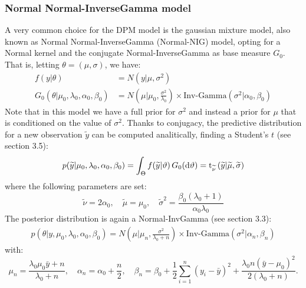 \subsubsection{Normal Normal-InverseGamma model} \label{nnig}
A very common choice for the DPM model is the gaussian mixture model, also known as Normal Normal-InverseGamma (Normal-NIG) model, opting for a Normal kernel and the conjugate Normal-InverseGamma as base measure $G_0$. That is, letting $\theta=(\mu,\sigma)$, we have:
\begin{equation}
	\begin{aligned}
		f(y|\theta)&=N(y| \mu ,\sigma^2)  \\
		G_0(\theta|\mu_0,\lambda_0, \alpha_0, 	\beta_0)
		&=N\left(\mu | \mu_0 ,\frac{\sigma^2} {\lambda_0}\right) \times \text{Inv-Gamma}(\sigma^2|\alpha_0, \beta_0 )
	\end{aligned}
\end{equation}
Note that in this model we have a full prior for $\sigma^2$ and instead a prior for $\mu$ that is conditioned on the value of $\sigma^2$.
Thanks to conjugacy, the predictive distribution for a new observation $\widetilde{y}$ can be computed analitically, finding a Student's $t$ (see \cite{integral} section 3.5):
\begin{align*}
	p(\widetilde{y}|\mu_0,\lambda_0, \alpha_0, \beta_0) =
	\int_\Theta f(\widetilde{y}|\vartheta) \, G_0(\mathrm d\vartheta) =
	\text{t}_{\widetilde \nu}\left(\widetilde{y}|\widetilde{\mu},\widetilde{\sigma}\right)
\end{align*}
where the following parameters are set:
$$
	\widetilde{\nu}=2 \alpha_0, \quad
	\widetilde{\mu}=\mu_0, \quad
	\widetilde{\sigma}^2= \frac{\beta_0(\lambda_0+1)}{\alpha_0 \lambda_0}
$$
The posterior distribution is again a Normal-InvGamma (see \cite{integral} section 3.3):
\begin{align*}
	p(\theta|y,\mu_0,\lambda_0, \alpha_0, \beta_0)=N\left(\mu | \mu_n ,\frac{\sigma^2} {\lambda_0 + n}\right) \times \text{Inv-Gamma}(\sigma^2|\alpha_n, \beta_n )
\end{align*}
with:
$$
\mu_n=\frac{\lambda_0 \mu_0 \bar{y} + n}{\lambda_0 + n}, \quad \alpha_n= \alpha_0 + \frac{n}{2}, \quad \beta_n= \beta_0 + \frac{1}{2}\sum_{i=1}^{n} (y_i-\bar{y})^2 + \frac{\lambda_0 n(\bar{y}-\mu_0)^2}{2(\lambda_0 + n)}.
$$
